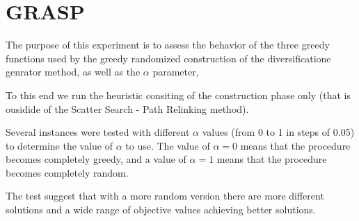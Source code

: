 \section{GRASP}
The purpose of this experiment
is to assess the behavior of the three greedy functions
used by the greedy randomized construction
of the diversificatione genrator method,
as well as the $\alpha$ parameter,

To this end
we run the heuristic consiting of
the construction phase only
(that is ousidide of the Scatter Search -
Path Relinking method).

Several instances were tested
with different $\alpha$ values
(from 0 to 1 in steps of 0.05)
to determine the value of $\alpha$ to use.
The value of $\alpha = 0$ means that
the procedure becomes completely greedy,
and a value of $\alpha = 1$ means that
the procedure becomes completely random.

The test suggest
that
with a more random version
there are more different solutions
and a wide range of objective values
achieving better solutions.
